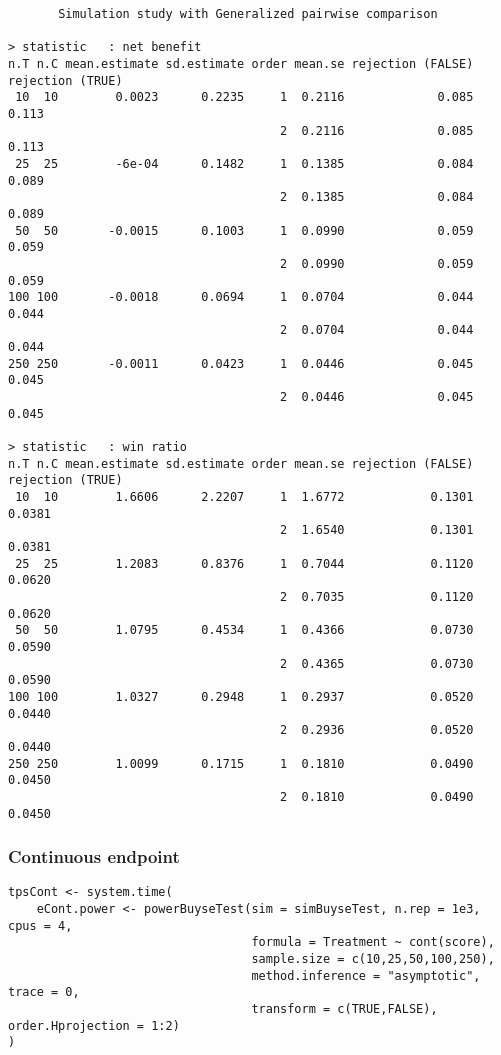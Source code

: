 \documentclass[12pt]{article}
\begin{document}
\begin{verbatim}
       Simulation study with Generalized pairwise comparison

> statistic   : net benefit
n.T n.C mean.estimate sd.estimate order mean.se rejection (FALSE) rejection (TRUE)
 10  10        0.0023      0.2235     1  0.2116             0.085            0.113
                                      2  0.2116             0.085            0.113
 25  25        -6e-04      0.1482     1  0.1385             0.084            0.089
                                      2  0.1385             0.084            0.089
 50  50       -0.0015      0.1003     1  0.0990             0.059            0.059
                                      2  0.0990             0.059            0.059
100 100       -0.0018      0.0694     1  0.0704             0.044            0.044
                                      2  0.0704             0.044            0.044
250 250       -0.0011      0.0423     1  0.0446             0.045            0.045
                                      2  0.0446             0.045            0.045

> statistic   : win ratio
n.T n.C mean.estimate sd.estimate order mean.se rejection (FALSE) rejection (TRUE)
 10  10        1.6606      2.2207     1  1.6772            0.1301           0.0381
                                      2  1.6540            0.1301           0.0381
 25  25        1.2083      0.8376     1  0.7044            0.1120           0.0620
                                      2  0.7035            0.1120           0.0620
 50  50        1.0795      0.4534     1  0.4366            0.0730           0.0590
                                      2  0.4365            0.0730           0.0590
100 100        1.0327      0.2948     1  0.2937            0.0520           0.0440
                                      2  0.2936            0.0520           0.0440
250 250        1.0099      0.1715     1  0.1810            0.0490           0.0450
                                      2  0.1810            0.0490           0.0450
\end{verbatim}

\clearpage

\subsubsection{Continuous endpoint}
\label{sec:org75eae1a}
\lstset{language=r,label= ,caption= ,captionpos=b,numbers=none}
\begin{lstlisting}
tpsCont <- system.time(
	eCont.power <- powerBuyseTest(sim = simBuyseTest, n.rep = 1e3, cpus = 4,
								  formula = Treatment ~ cont(score), 
								  sample.size = c(10,25,50,100,250), 
								  method.inference = "asymptotic", trace = 0,
								  transform = c(TRUE,FALSE), order.Hprojection = 1:2)
)
\end{lstlisting}
\end{document}
